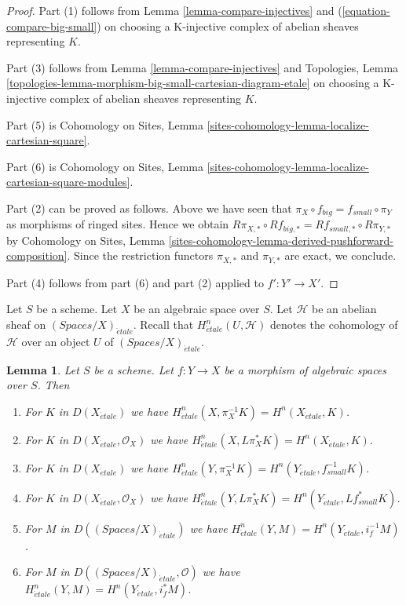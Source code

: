 \documentclass{stacks-project}
\theoremstyle{plain}
\newtheorem{lemma}[subsection]{Lemma}
\theoremstyle{definition}
\theoremstyle{remark}
\numberwithin{equation}{subsection}
\def\etale{{\acute{e}tale}}
\begin{document}
\begin{proof}
Part (1) follows from
Lemma \ref{lemma-compare-injectives}
and (\ref{equation-compare-big-small})
on choosing a K-injective complex of abelian sheaves representing $K$.

\medskip\noindent
Part (3) follows from Lemma \ref{lemma-compare-injectives}
and Topologies, Lemma
\ref{topologies-lemma-morphism-big-small-cartesian-diagram-etale}
on choosing a K-injective complex of abelian sheaves representing $K$.

\medskip\noindent
Part (5) is Cohomology on Sites, Lemma
\ref{sites-cohomology-lemma-localize-cartesian-square}.

\medskip\noindent
Part (6) is  Cohomology on Sites, Lemma
\ref{sites-cohomology-lemma-localize-cartesian-square-modules}.

\medskip\noindent
Part (2) can be proved as follows. Above we have seen
that $\pi_X \circ f_{big} = f_{small} \circ \pi_Y$ as morphisms
of ringed sites. Hence we obtain
$R\pi_{X, *} \circ Rf_{big, *} = Rf_{small, *} \circ R\pi_{Y, *}$
by Cohomology on Sites, Lemma
\ref{sites-cohomology-lemma-derived-pushforward-composition}.
Since the restriction functors $\pi_{X, *}$ and $\pi_{Y, *}$
are exact, we conclude.

\medskip\noindent
Part (4) follows from part (6) and part (2) applied to $f' : Y' \to X'$.
\end{proof}

\noindent
Let $S$ be a scheme. Let $X$ be an algebraic space over $S$.
Let $\mathcal{H}$ be an abelian sheaf on
$(\textit{Spaces}/X)_\etale$. Recall that $H^n_\etale(U, \mathcal{H})$
denotes the cohomology of $\mathcal{H}$ over an object
$U$ of $(\textit{Spaces}/X)_\etale$.

\begin{lemma}
\label{lemma-compare-cohomology}
Let $S$ be a scheme.
Let $f : Y \to X$ be a morphism of algebraic spaces over $S$. Then
\begin{enumerate}
\item For $K$ in $D(X_\etale)$ we have
$H^n_\etale(X, \pi_X^{-1}K) = H^n(X_\etale, K)$.
\item For $K$ in $D(X_\etale, \mathcal{O}_X)$ we have
$H^n_\etale(X, L\pi_X^*K) = H^n(X_\etale, K)$.
\item For $K$ in $D(X_\etale)$ we have
$H^n_\etale(Y, \pi_X^{-1}K) = H^n(Y_\etale, f_{small}^{-1}K)$.
\item For $K$ in $D(X_\etale, \mathcal{O}_X)$ we have
$H^n_\etale(Y, L\pi_X^*K) = H^n(Y_\etale, Lf_{small}^*K)$.
\item For $M$ in $D((\textit{Spaces}/X)_\etale)$ we have
$H^n_\etale(Y, M) = H^n(Y_\etale, i_f^{-1}M)$.
\item For $M$ in $D((\textit{Spaces}/X)_\etale, \mathcal{O})$ we have
$H^n_\etale(Y, M) = H^n(Y_\etale, i_f^*M)$.
\end{enumerate}
\end{lemma}
\end{document}
